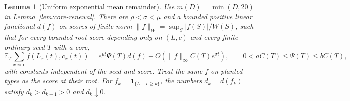 \documentclass[11pt]{article}
\newtheorem{lemma}{Lemma}[section]
\theoremstyle{remark}
\numberwithin{equation}{section}
\begin{document}
\begin{lemma}[Uniform exponential mean remainder]\label{lem:core-uniform}
Use $m(D)=\min(D,20)$ in Lemma~\ref{lem:core-renewal}. There are $\rho<\sigma<\mu$ and a bounded positive linear functional $d(f)$ on scores of finite norm $\|f\|_W=\sup_S|f(S)|/W(S)$, such that for every bounded root score depending only on $(L,c)$ and every finite ordinary seed $T$ with a core,
\begin{equation}\label{eq:core-unif}
 \mathbb E_T\sum_{x\,\mathrm{core}} f(L_x(t),c_x(t))
 =e^{\mu t}\Psi(T)d(f)+O(\|f\|_\infty C(T)e^{\sigma t}),
 \qquad 0<aC(T)\le\Psi(T)\le b C(T),
\end{equation}
with constants independent of the seed and score. Treat the same $f$ on planted types as the score at their root. For $f_k=\mathbf1_{\{L+c\ge k\}}$, the numbers $d_k=d(f_k)$ satisfy $d_k>d_{k+1}>0$ and $d_k\downarrow0$.
\end{lemma}
\end{document}
